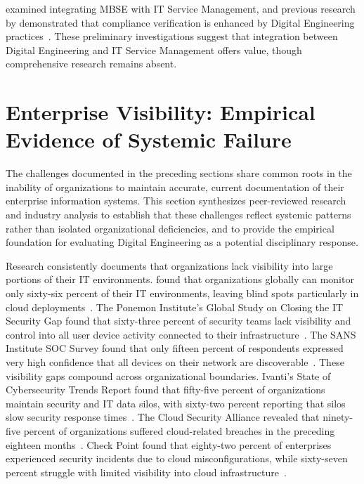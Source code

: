 \citeauthor{thompson2019integrating} examined integrating MBSE with IT Service Management, and previous research by \citeauthor{Bonar_Hastings_2024} demonstrated that compliance verification is enhanced by Digital Engineering practices~\parencite{thompson2019integrating, Bonar_Hastings_2024}. These preliminary investigations suggest that integration between Digital Engineering and IT Service Management offers value, though comprehensive research remains absent.

\section{Enterprise Visibility: Empirical Evidence of Systemic Failure}\label{sec:enterprise_visibility}

The challenges documented in the preceding sections share common roots in the inability of organizations to maintain accurate, current documentation of their enterprise information systems. This section synthesizes peer-reviewed research and industry analysis to establish that these challenges reflect systemic patterns rather than isolated organizational deficiencies, and to provide the empirical foundation for evaluating Digital Engineering as a potential disciplinary response.

Research consistently documents that organizations lack visibility into large portions of their IT environments. \citeauthor{IDC_Exabeam_2023} found that organizations globally can monitor only sixty-six percent of their IT environments, leaving blind spots particularly in cloud deployments~\parencite{IDC_Exabeam_2023}. The Ponemon Institute's Global Study on Closing the IT Security Gap found that sixty-three percent of security teams lack visibility and control into all user device activity connected to their infrastructure~\parencite{Ponemon_Visibility_2023}. The SANS Institute SOC Survey found that only fifteen percent of respondents expressed very high confidence that all devices on their network are discoverable~\parencite{SANS_SOC_Survey_2023}. These visibility gaps compound across organizational boundaries. Ivanti's State of Cybersecurity Trends Report found that fifty-five percent of organizations maintain security and IT data silos, with sixty-two percent reporting that silos slow security response times~\parencite{Ivanti_Cybersecurity_2025}. The Cloud Security Alliance revealed that ninety-five percent of organizations suffered cloud-related breaches in the preceding eighteen months~\parencite{CSA_Cloud_Security_2024}. Check Point found that eighty-two percent of enterprises experienced security incidents due to cloud misconfigurations, while sixty-seven percent struggle with limited visibility into cloud infrastructure~\parencite{Check_Point_Cloud_2024}.

